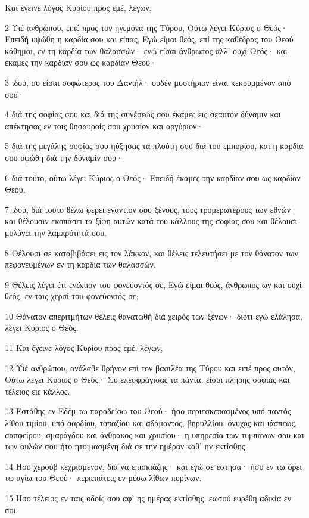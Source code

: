 \par Και έγεινε λόγος Κυρίου προς εμέ, λέγων,
\par 2 Υιέ ανθρώπου, ειπέ προς τον ηγεμόνα της Τύρου, Ούτω λέγει Κύριος ο Θεός· Επειδή υψώθη η καρδία σου και είπας, Εγώ είμαι θεός, επί της καθέδρας του Θεού κάθημαι, εν τη καρδία των θαλασσών· ενώ είσαι άνθρωπος αλλ' ουχί Θεός· και έκαμες την καρδίαν σου ως καρδίαν Θεού·
\par 3 ιδού, συ είσαι σοφώτερος του Δανιήλ· ουδέν μυστήριον είναι κεκρυμμένον από σού·
\par 4 διά της σοφίας σου και διά της συνέσεώς σου έκαμες εις σεαυτόν δύναμιν και απέκτησας εν τοις θησαυροίς σου χρυσίον και αργύριον·
\par 5 διά της μεγάλης σοφίας σου ηύξησας τα πλούτη σου διά του εμπορίου, και η καρδία σου υψώθη διά την δύναμίν σου·
\par 6 διά τούτο, ούτω λέγει Κύριος ο Θεός· Επειδή έκαμες την καρδίαν σου ως καρδίαν Θεού,
\par 7 ιδού, διά τούτο θέλω φέρει εναντίον σου ξένους, τους τρομερωτέρους των εθνών· και θέλουσιν εκσπάσει τα ξίφη αυτών κατά του κάλλους της σοφίας σου και θέλουσι μολύνει την λαμπρότητά σου.
\par 8 Θέλουσι σε καταβιβάσει εις τον λάκκον, και θέλεις τελευτήσει με τον θάνατον των πεφονευμένων εν τη καρδία των θαλασσών.
\par 9 Θέλεις λέγει έτι ενώπιον του φονεύοντός σε, Εγώ είμαι θεός, άνθρωπος ων και ουχί θεός, εν ταις χερσί του φονεύοντός σε;
\par 10 Θάνατον απεριτμήτων θέλεις θανατωθή διά χειρός των ξένων· διότι εγώ ελάλησα, λέγει Κύριος ο Θεός.
\par 11 Και έγεινε λόγος Κυρίου προς εμέ, λέγων,
\par 12 Υιέ ανθρώπου, ανάλαβε θρήνον επί τον βασιλέα της Τύρου και ειπέ προς αυτόν, Ούτω λέγει Κύριος ο Θεός· Συ επεσφράγισας τα πάντα, είσαι πλήρης σοφίας και τέλειος εις κάλλος.
\par 13 Εστάθης εν Εδέμ τω παραδείσω του Θεού· ήσο περιεσκεπασμένος υπό παντός λίθου τιμίου, υπό σαρδίου, τοπαζίου και αδάμαντος, βηρυλλίου, όνυχος και ιάσπεως, σαπφείρου, σμαράγδου και άνθρακος και χρυσίου· η υπηρεσία των τυμπάνων σου και των αυλών σου ήτο ητοιμασμένη διά σε την ημέραν καθ' ην εκτίσθης.
\par 14 Ησο χερούβ κεχρισμένον, διά να επισκιάζης· και εγώ σε έστησα· ήσο εν τω όρει τω αγίω του Θεού· περιεπάτεις εν μέσω λίθων πυρίνων.
\par 15 Ησο τέλειος εν ταις οδοίς σου αφ' ης ημέρας εκτίσθης, εωσού ευρέθη αδικία εν σοι.
